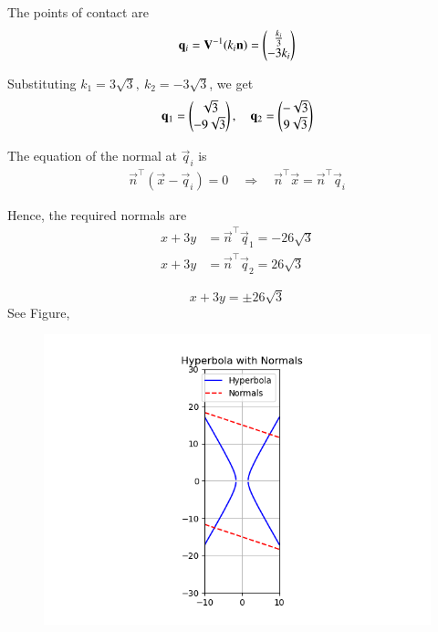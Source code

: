 \documentclass[journal]{IEEEtran}
\begin{document}
The points of contact are
\begin{align}
\mathbf{q}_i = \mathbf{V}^{-1} (k_i \mathbf{n})
= \begin{pmatrix}\tfrac{k_i}{3} \\ -3 k_i\end{pmatrix}
\end{align}

Substituting $k_1 = 3\sqrt{3},\ k_2 = -3\sqrt{3}$, we get
\begin{align}
\mathbf{q}_1 = \begin{pmatrix}\sqrt{3} \\ -9\sqrt{3}\end{pmatrix}, \quad
\mathbf{q}_2 = \begin{pmatrix}-\sqrt{3} \\ 9\sqrt{3}\end{pmatrix}
\end{align}

The equation of the normal at $\vec{q}_i$ is
\begin{align}
\vec{n}^\top (\vec{x} - \vec{q}_i) = 0
\quad \Rightarrow \quad
\vec{n}^\top \vec{x} = \vec{n}^\top \vec{q}_i
\end{align}

Hence, the required normals are
\begin{align}
x + 3y &= \vec{n}^\top \vec{q}_1 = -26\sqrt{3} \\
x + 3y &= \vec{n}^\top \vec{q}_2 = 26\sqrt{3}
\end{align}

\[
\boxed{x + 3y = \pm 26\sqrt{3}}
\]
See Figure,
\begin{figure}[h!]
    \centering
    \includegraphics[height=0.5\columnwidth, keepaspectratio]{Figs/Figure_1.png}
    \label{figure_1}
\end{figure}
\end{document}
